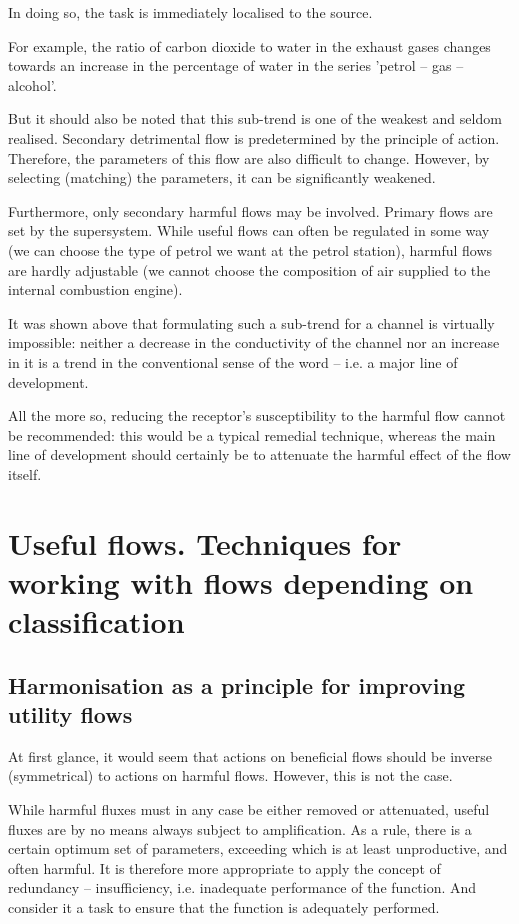 \documentclass[a4paper,11pt]{article}
\begin{document}
In doing so, the task is immediately localised to the source.

For example, the ratio of carbon dioxide to water in the exhaust gases changes
towards an increase in the percentage of water in the series 'petrol -- gas --
alcohol'.

But it should also be noted that this sub-trend is one of the weakest and
seldom realised. Secondary detrimental flow is predetermined by the principle
of action. Therefore, the parameters of this flow are also difficult to
change. However, by selecting (matching) the parameters, it can be
significantly weakened.

Furthermore, only secondary harmful flows may be involved. Primary flows are
set by the supersystem. While useful flows can often be regulated in some way
(we can choose the type of petrol we want at the petrol station), harmful
flows are hardly adjustable (we cannot choose the composition of air supplied
to the internal combustion engine).

It was shown above that formulating such a sub-trend for a channel is
virtually impossible: neither a decrease in the conductivity of the channel
nor an increase in it is a trend in the conventional sense of the word --
i.e. a major line of development.

All the more so, reducing the receptor's susceptibility to the harmful flow
cannot be recommended: this would be a typical remedial technique, whereas the
main line of development should certainly be to attenuate the harmful effect
of the flow itself.

\section{Useful flows. Techniques for working with flows depending on
  classification} 

\subsection{Harmonisation as a principle for improving utility flows}

At first glance, it would seem that actions on beneficial flows should be
inverse (symmetrical) to actions on harmful flows. However, this is not the
case.

While harmful fluxes must in any case be either removed or attenuated, useful
fluxes are by no means always subject to amplification. As a rule, there is a
certain optimum set of parameters, exceeding which is at least unproductive,
and often harmful. It is therefore more appropriate to apply the concept of
redundancy -- insufficiency, i.e. inadequate performance of the function. And
consider it a task to ensure that the function is adequately performed.
\end{document}
